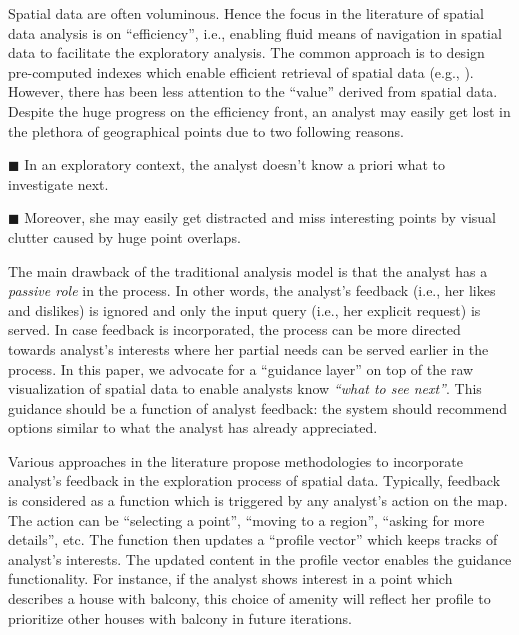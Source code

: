\documentclass[sigconf,edbt]{acmart-edbt2019}
\begin{document}
\vspace{3pt}
Spatial data are often voluminous. Hence the focus in the literature of spatial data analysis is on ``efficiency'', i.e., enabling fluid means of navigation in spatial data to facilitate the exploratory analysis. The common approach is to design pre-computed indexes which enable efficient retrieval of spatial data (e.g., \cite{lins2013nanocubes}). However, there has been less attention to the ``value'' derived from spatial data. Despite the huge progress on the efficiency front, an analyst may easily get lost in the plethora of geographical points due to two following reasons.

\vspace{3pt}
\noindent $\blacksquare$ In an exploratory context, the analyst doesn't know a priori what to investigate next.

\vspace{2pt}
\noindent $\blacksquare$ Moreover, she may easily get distracted and miss interesting points by visual clutter caused by huge point overlaps.

\vspace{3pt}
The main drawback of the traditional analysis model is that the analyst has a {\em passive role} in the process. In other words, the analyst's feedback (i.e., her likes and dislikes) is ignored and only the input query (i.e., her explicit request) is served. In case feedback is incorporated, the process can be more directed towards analyst's interests where her partial needs can be served earlier in the process. In this paper, we advocate for a ``guidance layer'' on top of the raw visualization of spatial data to enable analysts know {\em ``what to see next''}. This guidance should be a function of analyst feedback: the system should recommend options similar to what the analyst has already appreciated. 

\vspace{2pt}
Various approaches \cite{Ballatore2008,Liu:2010,xin2006discovering,bhuiyan2012interactive} in the literature propose methodologies to incorporate analyst's feedback in the exploration process of spatial data. Typically, feedback is considered as a function which is triggered by any analyst's action on the map. The action can be ``selecting a point'', ``moving to a region'', ``asking for more details'', etc. The function then updates a ``profile vector'' which keeps tracks of analyst's interests. The updated content in the profile vector enables the guidance functionality. For instance, if the analyst shows interest in a point which describes a house with balcony, this choice of amenity will reflect her profile to prioritize other houses with balcony in future iterations.
\end{document}
